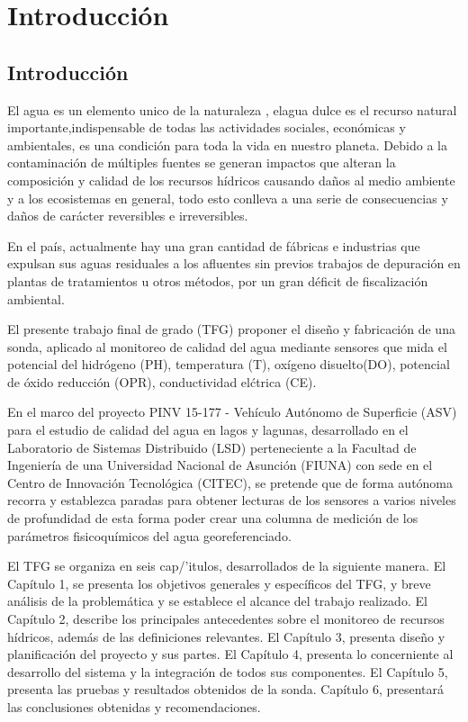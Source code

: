 \chapter[Capítulo 1. Introducción]{Introducción}
\pagestyle{fancy}

\section{Introducción}
El agua es un elemento unico de la naturaleza \cite{caribbean_seguridad_2020}, elagua dulce es el recurso natural importante,indispensable de todas las actividades sociales, económicas y ambientales, es una condición para toda la vida en nuestro planeta.
Debido a la contaminación de múltiples fuentes se generan impactos que alteran la composición y calidad de los recursos hídricos causando daños al medio ambiente y a los ecosistemas en general, todo esto conlleva a una serie de consecuencias y daños de carácter reversibles e irreversibles.

En el pa\'is, actualmente hay una gran cantidad de f\'abricas e industrias que expulsan sus aguas residuales a los afluentes sin previos trabajos de depuraci\'on en plantas de tratamientos u otros m\'etodos, por un gran d\'eficit de fiscalizaci\'on ambiental.

%
%
%
%

El presente trabajo final de grado (TFG) proponer el dise\~no y fabricación de una sonda, aplicado al monitoreo de calidad del agua mediante sensores que mida el potencial del hidr\'ogeno (PH), temperatura (T), oxígeno disuelto(DO), potencial de óxido reducci\'on (OPR), conductividad el\'ctrica (CE).
 
En el marco del proyecto  PINV 15-177 - Veh\'iculo Aut\'onomo de Superficie (ASV) para el estudio de calidad del agua en lagos y lagunas, desarrollado en el Laboratorio de Sistemas Distribuido (LSD) perteneciente a la Facultad de Ingenier\'ia de una Universidad Nacional de Asunci\'on (FIUNA) con sede en el Centro de Innovaci\'on Tecnol\'ogica (CITEC), se pretende que de forma aut\'onoma recorra y establezca paradas para obtener lecturas de los sensores a varios niveles de profundidad de esta forma poder crear una columna de medición de los parámetros fisicoquímicos del agua georeferenciado.

El TFG  se organiza en seis cap/'itulos, desarrollados de la siguiente manera. 
El Capítulo 1, se presenta los objetivos generales y espec\'ificos del TFG,  y breve an\'alisis de la problem\'atica y se establece el alcance del trabajo realizado.
El Capítulo 2, describe los principales antecedentes sobre el monitoreo de recursos h\'idricos, adem\'as de las definiciones relevantes. 
El Capítulo 3, presenta dise\~no y planificaci\'on del proyecto y sus partes.
El Capítulo 4, presenta lo concerniente al desarrollo del sistema y la integraci\'on de todos sus componentes.   
El Capítulo 5, presenta las pruebas y resultados obtenidos de la sonda. 
Capítulo 6,  presentará las conclusiones obtenidas y recomendaciones.

